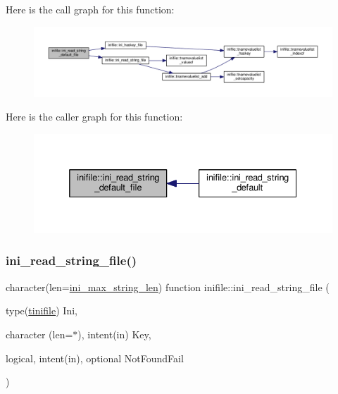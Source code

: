 Here is the call graph for this function\+:
\nopagebreak
\begin{figure}[H]
\begin{center}
\leavevmode
\includegraphics[width=350pt]{namespaceinifile_a7af43d0285b9f48d8082252153920a68_cgraph}
\end{center}
\end{figure}
Here is the caller graph for this function\+:
\nopagebreak
\begin{figure}[H]
\begin{center}
\leavevmode
\includegraphics[width=332pt]{namespaceinifile_a7af43d0285b9f48d8082252153920a68_icgraph}
\end{center}
\end{figure}
\mbox{\label{namespaceinifile_a83d64e9da5ab1119c623d180ebefa77f}} 
\subsubsection{\texorpdfstring{ini\+\_\+read\+\_\+string\+\_\+file()}{ini\_read\_string\_file()}}
{\footnotesize\ttfamily character(len=\mbox{\hyperlink{namespaceinifile_a32faebf83b580d14b5af965dcb4eebfd}{ini\+\_\+max\+\_\+string\+\_\+len}}) function inifile\+::ini\+\_\+read\+\_\+string\+\_\+file (\begin{DoxyParamCaption}\item[{type(\mbox{\hyperlink{structinifile_1_1tinifile}{tinifile}})}]{Ini,  }\item[{character (len=$\ast$), intent(in)}]{Key,  }\item[{logical, intent(in), optional}]{Not\+Found\+Fail }\end{DoxyParamCaption})}



